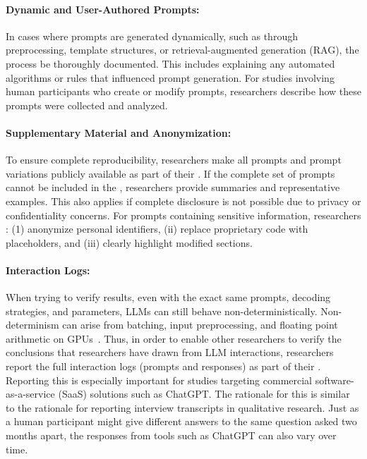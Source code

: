 \paragraph{Dynamic and User-Authored Prompts:}
In cases where prompts are generated dynamically, such as through preprocessing, template structures, or retrieval-augmented generation (RAG), the process \must be thoroughly documented.
This includes explaining any automated algorithms or rules that influenced prompt generation.
For studies involving human participants who create or modify prompts, researchers \must describe how these prompts were collected and analyzed.

\paragraph{Supplementary Material and Anonymization:}
To ensure complete reproducibility, researchers \must make all prompts and prompt variations publicly available as part of their \supplementarymaterial.
If the complete set of prompts cannot be included in the \paper, researchers \should provide summaries and representative examples.
This also applies if complete disclosure is not possible due to privacy or confidentiality concerns.
For prompts containing sensitive information, researchers \must: (1) anonymize personal identifiers, (ii) replace proprietary code with placeholders, and (iii) clearly highlight modified sections.

\paragraph{Interaction Logs:}
When trying to verify results, even with the exact same prompts, decoding strategies, and parameters, LLMs can still behave non-deterministically.
Non-determinism can arise from batching, input preprocessing, and floating point arithmetic on GPUs~\cite{Chann2023}.
Thus, in order to enable other researchers to verify the conclusions that researchers have drawn from LLM interactions, researchers \should report the full interaction logs (prompts and responses) as part of their \supplementarymaterial.
Reporting this is especially important for studies targeting commercial software-as-a-service (SaaS) solutions such as ChatGPT.
The rationale for this is similar to the rationale for reporting interview transcripts in qualitative research.
Just as a human participant might give different answers to the same question asked two months apart, the responses from tools such as ChatGPT can also vary over time.

